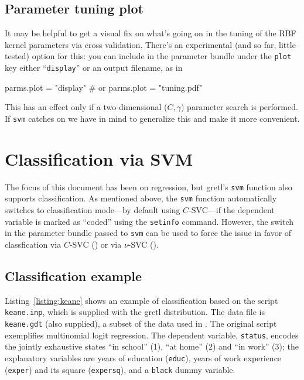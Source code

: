 \documentclass{article}
\begin{document}
\subsection{Parameter tuning plot}
\label{sec:plot}

It may be helpful to get a visual fix on what's going on in the tuning
of the RBF kernel parameters via cross validation. There's an
experimental (and so far, little tested) option for this: you can
include in the parameter bundle under the \texttt{plot} key either
``\texttt{display}'' or an output filename, as in
\begin{code}
parms.plot = "display"
# or
parms.plot = "tuning.pdf"
\end{code}
This has an effect only if a two-dimensional ($C, \gamma$) parameter
search is performed. If \texttt{svm} catches on we have in mind to
generalize this and make it more convenient.

\section{Classification via SVM}
\label{sec:SVC}

The focus of this document has been on regression, but gretl's
\texttt{svm} function also supports classification. As mentioned
above, the \texttt{svm} function automatically switches to
classification mode---by default using $C$-SVC---if the dependent
variable is marked as ``coded'' using the \texttt{setinfo} command.
However, the  switch in the parameter bundle passed
to \texttt{svm} can be used to force the issue in favor of
classfication via $C$-SVC () or via $\nu$-SVC
().

\subsection{Classification example}
\label{sec:SVC-example}

Listing~\ref{listing:keane} shows an example of classification based
on the script \texttt{keane.inp}, which is supplied with the gretl
distribution. The data file is \texttt{keane.gdt} (also supplied), a
subset of the data used in \cite{keane97}. The original script
exemplifies multinomial logit regression. The dependent variable,
\texttt{status}, encodes the jointly exhaustive states ``in school''
(1), ``at home'' (2) and ``in work'' (3); the explanatory variables
are years of education (\texttt{educ}), years of work experience
(\texttt{exper}) and its square (\texttt{expersq}), and a
\texttt{black} dummy variable.
\end{document}
